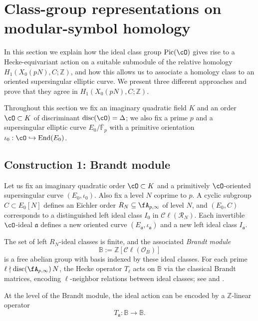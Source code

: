 \documentclass[10pt]{amsart}
\theoremstyle{theostyle}
\newcommand{\Cl}{\mathcal{C}\!\ell}
\newcommand{\FF}{\mathbb{F}} \newcommand{\HH}{\mathbb{H}}
\newcommand{\ZZ}{\mathbb{Z}}
\newcommand{\disc}{\mathrm{disc}}
\renewcommand{\fa}{\mathfrak{a}} \newcommand{\fb}{\mathfrak{b}} \newcommand{\fc}{\mathfrak{c}}
\newcommand{\End}{\mathrm{End}}
\newcommand{\Pic}{\mathrm{Pic}}
\begin{document}
\section{Class-group representations on modular-symbol homology}
\label{sec:representations}

In this section we explain how the ideal class group $\Pic(\cO)$ gives rise
to a Hecke-equivariant action on a suitable submodule of the relative homology
$H_1(X_0(pN),C;\ZZ)$, and how this allows us to associate a homology class to
an oriented supersingular elliptic curve. We present three different approaches and prove that
they agree in $H_1(X_0(pN),C;\ZZ)$.

Throughout this section we fix an imaginary quadratic field $K$ and an order $\cO\subset K$ of discriminant $\disc(\cO)=\Delta$; we also fix a prime $p$ and a supersingular elliptic curve $E_0/\overline{\FF}_{p}$ with a primitive orientation
$\iota_0:\cO\hookrightarrow\End(E_0)$.

\subsection{Construction 1: Brandt module}


Let us fix an imaginary quadratic order $\cO\subset K$ and a primitively $\cO$-oriented supersingular curve $(E_0,\iota_0)$. Also fix a level $N$ coprime to $p$. A cyclic subgroup $C\subset E_0[N]$ defines an Eichler order $R_N\subseteq\fA_{p,\infty}$ of level $N$, and $(E_0,C)$ corresponds to a distinguished
left ideal class $I_0$ in $\Cl(\mathcal R_N)$. Each invertible $\cO$-ideal
$\fa$ defines a new oriented curve $(E_\fa,\iota_\fa)$ and a new left ideal
class $I_\fa$. 

The set of left $R_N$-ideal classes is finite, and the associated
\emph{Brandt module}
\[
\mathbb B := \ZZ[\Cl(\mathcal O_B)]
\]
is a free abelian group with basis indexed by these ideal classes.  For each
prime $\ell\nmid \mathrm{disc}(\fA_{p,\infty})\,N$, the Hecke operator $T_\ell$ acts on
$\mathbb B$ via the classical Brandt matrices, encoding $\ell$-neighbor
relations between ideal classes; see \cite{Pizer:ModForms} and
\cite[\S 3.2]{Kohel:Hecke}.

At the level of the Brandt module, the ideal action can be
encoded by a $\ZZ$-linear operator
\[
T_\fa : \mathbb B \longrightarrow \mathbb B.
\]
\end{document}
